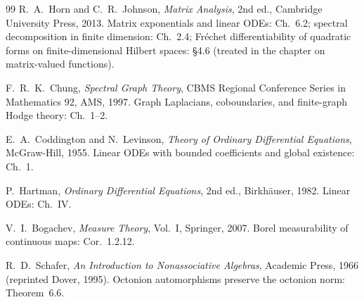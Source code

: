 \documentclass[11pt, a4paper]{amsart}
\theoremstyle{definition}
\begin{document}
\begin{thebibliography}{99}
R.~A.~Horn and C.~R.~Johnson, \emph{Matrix Analysis}, 2nd ed.,
Cambridge University Press, 2013. Matrix exponentials and linear
ODEs: Ch.~6.2; spectral decomposition in finite dimension:
Ch.~2.4; Fr\'echet differentiability of quadratic forms on
finite-dimensional Hilbert spaces: \S 4.6 (treated in the chapter
on matrix-valued functions).

F.~R.~K.~Chung, \emph{Spectral Graph Theory}, CBMS Regional
Conference Series in Mathematics 92, AMS, 1997. Graph Laplacians,
coboundaries, and finite-graph Hodge theory: Ch.~1--2.

E.~A.~Coddington and N.~Levinson, \emph{Theory of Ordinary
Differential Equations}, McGraw-Hill, 1955. Linear ODEs with
bounded coefficients and global existence: Ch.~1.

P.~Hartman, \emph{Ordinary Differential Equations}, 2nd ed.,
Birkh\"auser, 1982. Linear ODEs: Ch.~IV.

V.~I.~Bogachev, \emph{Measure Theory}, Vol.~I, Springer, 2007.
Borel measurability of continuous maps: Cor.~1.2.12.

R.~D.~Schafer, \emph{An Introduction to Nonassociative Algebras},
Academic Press, 1966 (reprinted Dover, 1995). Octonion
automorphisms preserve the octonion norm: Theorem~6.6.

\end{thebibliography}
\end{document}
